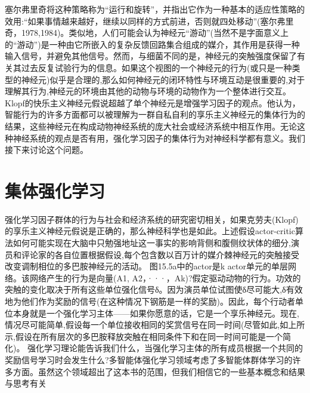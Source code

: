 塞尔弗里奇将这种策略称为“运行和旋转”，并指出它作为一种基本的适应性策略的效用:“如果事情越来越好，继续以同样的方式前进，否则就四处移动”(塞尔弗里奇，1978,1984)。类似地，人们可能会认为神经元“游动”(当然不是字面意义上的“游动”)是一种由它所嵌入的复杂反馈回路集合组成的媒介，其作用是获得一种输入信号，并避免其他信号。然而，与细菌不同的是，神经元的突触强度保留了有关其过去反复试验行为的信息。如果这个视图的一个神经元的行为(或只是一种类型的神经元)似乎是合理的,那么如何神经元的闭环特性与环境互动是很重要的,对于理解其行为,神经元的环境由其他的动物与环境的动物作为一个整体进行交互。
Klopf的快乐主义神经元假说超越了单个神经元是增强学习因子的观点。他认为，智能行为的许多方面都可以被理解为一群自私自利的享乐主义神经元的集体行为的结果，这些神经元在构成动物神经系统的庞大社会或经济系统中相互作用。无论这种神经系统的观点是否有用，强化学习因子的集体行为对神经科学都有意义。我们接下来讨论这个问题。

\section{集体强化学习}

强化学习因子群体的行为与社会和经济系统的研究密切相关，如果克劳夫(Klopf)的享乐主义神经元假说是正确的，那么神经科学也是如此。上述假设actor-critic算法如何可能实现在大脑中只勉强地址这一事实的影响背侧和腹侧纹状体的细分,演员和评论家的各自位置根据假设,每个包含数以百万计的媒介棘神经元的突触接受改变调制相位的多巴胺神经元的活动。
图15.5a中的actor是k actor单元的单层网络。该网络产生的行为是向量(A1, A2，···，Ak)?假定驱动动物的行为。功效的突触的变化取决于所有这些单位强化信号δ。因为演员单位试图使δ尽可能大,δ有效地为他们作为奖励的信号(在这种情况下钢筋是一样的奖励)。因此，每个行动者单位本身就是一个强化学习主体——如果你愿意的话，它是一个享乐神经元。现在,情况尽可能简单,假设每一个单位接收相同的奖赏信号在同一时间(尽管如此,如上所示,假设在所有层次的多巴胺释放突触在相同条件下和在同一时间可能是一个简化)。
强化学习理论能告诉我们什么，当强化学习主体的所有成员根据一个共同的奖励信号学习时会发生什么?多智能体强化学习领域考虑了多智能体群体学习的许多方面。虽然这个领域超出了这本书的范围，但我们相信它的一些基本概念和结果与思考有关

